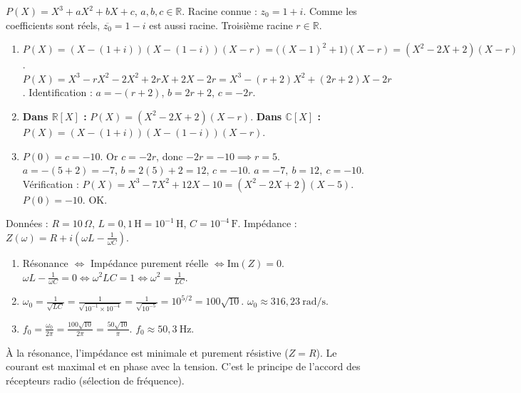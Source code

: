 \documentclass[11pt]{article}
\begin{document}
\begin{corrige}
$P(X) = X^3 + aX^2 + bX + c$, $a,b,c \in \mathbb{R}$.
Racine connue : $z_0 = 1+i$. Comme les coefficients sont réels, $\overline{z_0} = 1-i$ est aussi racine.
Troisième racine $r \in \mathbb{R}$.
\begin{enumerate}
\item $P(X) = (X - (1+i))(X - (1-i))(X - r) = \bigl((X-1)^2 + 1\bigr)(X-r) = (X^2 - 2X + 2)(X-r)$.
$P(X) = X^3 - rX^2 - 2X^2 + 2rX + 2X - 2r = X^3 - (r+2)X^2 + (2r+2)X - 2r$.
Identification : $\boxed{a = -(r+2)}$, $\boxed{b = 2r+2}$, $\boxed{c = -2r}$.

\item \textbf{Dans $\mathbb{R}[X]$ :} $\boxed{P(X) = (X^2 - 2X + 2)(X - r)}$.
\textbf{Dans $\mathbb{C}[X]$ :} $\boxed{P(X) = (X - (1+i))(X - (1-i))(X - r)}$.

\item $P(0) = c = -10$. Or $c = -2r$, donc $-2r = -10 \implies r = 5$.
$a = -(5+2) = -7$, $b = 2(5)+2 = 12$, $c = -10$.
$\boxed{a=-7,\ b=12,\ c=-10}$.
Vérification : $P(X) = X^3 - 7X^2 + 12X - 10 = (X^2-2X+2)(X-5)$. $P(0)=-10$. OK.
\end{enumerate}
\end{corrige}

\begin{corrige}
Données : $R = 10\,\Omega$, $L = 0,1\,\text{H} = 10^{-1}\,\text{H}$, $C = 10^{-4}\,\text{F}$.
Impédance : $Z(\omega) = R + i\left(\omega L - \frac{1}{\omega C}\right)$.
\begin{enumerate}
\item Résonance $\iff$ Impédance purement réelle $\iff \text{Im}(Z) = 0$.
$\omega L - \frac{1}{\omega C} = 0 \iff \omega^2 LC = 1 \iff \boxed{\omega^2 = \frac{1}{LC}}$.

\item $\omega_0 = \frac{1}{\sqrt{LC}} = \frac{1}{\sqrt{10^{-1} \times 10^{-4}}} = \frac{1}{\sqrt{10^{-5}}} = 10^{5/2} = 100\sqrt{10}$.
$\omega_0 \approx \boxed{316,23\ \text{rad/s}}$.

\item $f_0 = \frac{\omega_0}{2\pi} = \frac{100\sqrt{10}}{2\pi} = \frac{50\sqrt{10}}{\pi}$.
$f_0 \approx \boxed{50,3\ \text{Hz}}$.
\end{enumerate}
\begin{savaistu}
À la résonance, l'impédance est minimale et purement résistive ($Z=R$). Le courant est maximal et en phase avec la tension. C'est le principe de l'accord des récepteurs radio (sélection de fréquence).
\end{savaistu}
\end{corrige}
\end{document}
